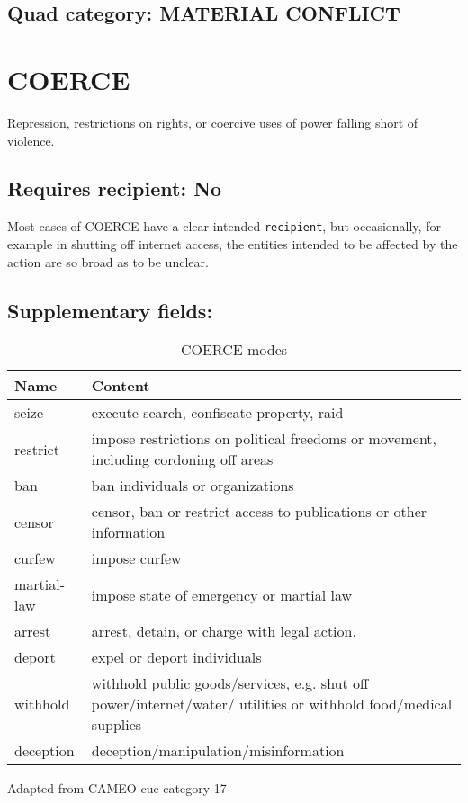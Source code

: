 \documentclass[11pt]{report}
\newcommand{\plcat}[1]{\textsf{#1}}
\newcommand{\txt}[1]{\texttt{#1}}
\begin{document}
 
\subsection{Quad category: MATERIAL CONFLICT}

\newpage  

\section{COERCE}

Repression, restrictions on rights, or coercive uses of power falling short of violence.

\subsection{Requires recipient: No}

Most cases of \plcat{COERCE} have a clear intended \txt{recipient}, but occasionally, for example in shutting off internet access, the entities intended to be affected by the action are so broad as to be unclear. 

\subsection{Supplementary fields: }

\begin{table}[htp]
\caption{COERCE modes}
\begin{center}
\begin{tabular}{|p{}|L{.73\textwidth}|}
\hline
Name & Content \\
\hline
seize & execute search, confiscate property, raid \\
restrict & impose restrictions on political freedoms or movement, including cordoning off areas \\
ban & ban individuals or organizations \\
censor & censor, ban or restrict access to publications or other information  \\
curfew & impose curfew \\
martial-law & impose state of emergency or martial law \\
arrest & arrest, detain, or charge with legal action.  \\
deport & expel or deport individuals \\
withhold & withhold public goods/services, e.g. shut off power/internet/water/ utilities or withhold food/medical supplies \\
deception & deception/manipulation/misinformation \\
\hline
\end{tabular}
\end{center}
\label{tab:coerce}
Adapted from CAMEO cue category 17
\end{table}%
\end{document}
